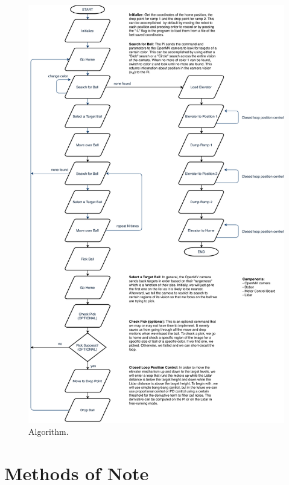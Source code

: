 \documentclass{article}
\begin{document}
\begin{figure}[H]
		\centering
		\includegraphics[keepaspectratio,height=\textheight]{SP_project_flowchart.pdf}
		\caption{Algorithm.}
\end{figure}

\section{Methods of Note}
\end{document}
